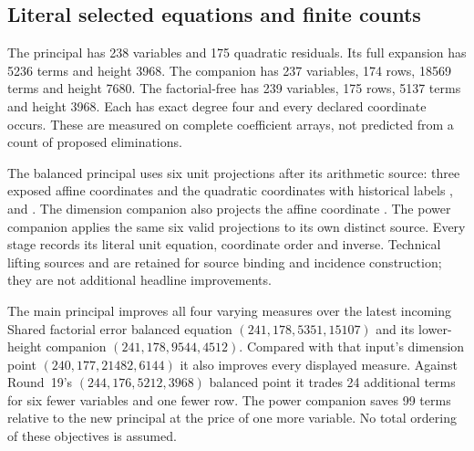 \subsection{Literal selected equations and finite counts}
The principal  has 238 variables
and 175 quadratic residuals. Its full expansion has 5236 terms and height
3968. The companion  has 237 variables,
174 rows, 18569 terms and height 7680. The factorial-free
 has 239 variables, 175 rows, 5137 terms and
height 3968. Each has exact degree four and every declared coordinate
occurs. These are measured on complete coefficient arrays, not predicted
from a count of proposed eliminations.

The balanced principal uses six unit projections after its arithmetic
source: three exposed affine coordinates and the quadratic coordinates
with historical labels ,  and
. The dimension companion also projects the affine
coordinate . The power companion applies the same six
valid projections to its own distinct source. Every stage records its
literal unit equation, coordinate order and inverse. Technical lifting
sources  and  are retained for
source binding and incidence construction; they are not additional
headline improvements.

The main principal improves all four varying measures over the latest
incoming Shared factorial error balanced equation
$(241,178,5351,15107)$ and its lower-height companion
$(241,178,9544,4512)$. Compared with that input's dimension point
$(240,177,21482,6144)$ it also improves every displayed measure.
Against Round~19's $(244,176,5212,3968)$ balanced point it trades
24 additional terms for six fewer variables and one fewer row.
The power companion saves 99 terms relative to the new principal at
the price of one more variable. No total ordering of these objectives
is assumed.
